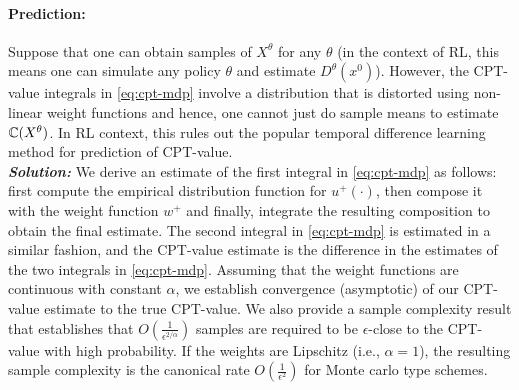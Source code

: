 \documentclass[11pt,letterpaper,english]{article}
\begin{document}
\paragraph{Prediction:} Suppose that one can obtain samples of $X^\theta$ for any $\theta$ (in the context of RL, this means one can simulate any policy $\theta$ and estimate $D^\theta(x^0)$). However, the CPT-value integrals in \eqref{eq:cpt-mdp} involve a distribution that is distorted using non-linear weight functions and hence, one cannot just do sample means to estimate $\mathbb{C}(X^\theta)$. In RL context, this rules out the popular temporal difference learning method for prediction of CPT-value. \\
\textit{\textbf{Solution:}} 
We derive an estimate of the first integral in \eqref{eq:cpt-mdp} as follows:
first compute the empirical distribution function for $u^+(\cdot)$, then compose it with the weight function $w^+$ and finally, integrate the resulting composition to obtain the final estimate. The second integral in \eqref{eq:cpt-mdp} is estimated in a similar fashion, and the CPT-value estimate is the difference in the estimates of the two integrals in \eqref{eq:cpt-mdp}.
Assuming that the weight functions are \holder continuous with constant $\alpha$,  we establish convergence (asymptotic) of our CPT-value estimate to the true CPT-value. We also provide a sample complexity result that establishes that  $O\left(\frac1{\epsilon^{2/\alpha}}\right)$ samples are required to be $\epsilon$-close to the CPT-value with high probability. If the weights are Lipschitz (i.e., $\alpha=1$), the resulting sample complexity is the canonical rate $O\left(\frac1{\epsilon^2}\right)$ for Monte carlo type schemes.
\end{document}
